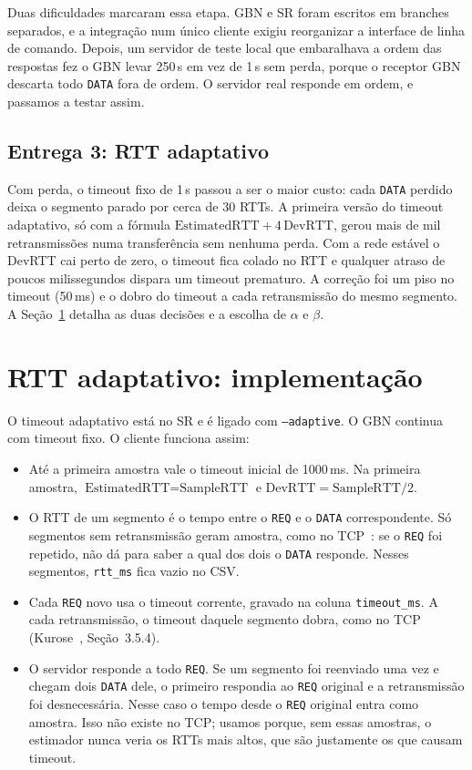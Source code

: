 \documentclass[11pt,a4paper]{article}
\begin{document}
Duas dificuldades marcaram essa etapa. GBN e SR foram escritos em branches
separados, e a integração num único cliente exigiu reorganizar a interface de
linha de comando. Depois, um servidor de teste local que embaralhava a ordem
das respostas fez o GBN levar 250\,s em vez de 1\,s sem perda, porque o
receptor GBN descarta todo \texttt{DATA} fora de ordem. O servidor real responde
em ordem, e passamos a testar assim.

\subsection{Entrega 3: RTT adaptativo}

Com perda, o timeout fixo de 1\,s passou a ser o maior custo: cada
\texttt{DATA} perdido deixa o segmento parado por cerca de 30 RTTs. A primeira
versão do timeout adaptativo, só com a fórmula $\text{EstimatedRTT} +
4\,\text{DevRTT}$, gerou mais de mil retransmissões numa transferência sem
nenhuma perda. Com a
rede estável o DevRTT cai perto de zero, o timeout fica colado no RTT e
qualquer atraso de poucos milissegundos dispara um timeout prematuro. A
correção foi um piso no timeout (50\,ms) e o dobro do timeout a cada
retransmissão do mesmo segmento. A Seção~\ref{sec:rtt} detalha as duas
decisões e a escolha de $\alpha$ e $\beta$.

\section{RTT adaptativo: implementação}
\label{sec:rtt}

O timeout adaptativo está no SR e é ligado com \texttt{--adaptive}. O GBN
continua com timeout fixo. O cliente funciona assim:
\begin{itemize}[nosep]
  \item Até a primeira amostra vale o timeout inicial de 1000\,ms. Na primeira
    amostra, $\text{EstimatedRTT} = \text{SampleRTT}$ e
    $\text{DevRTT} = \text{SampleRTT}/2$.
  \item O RTT de um segmento é o tempo entre o \texttt{REQ} e o \texttt{DATA}
    correspondente. Só segmentos sem retransmissão geram amostra, como no
    TCP~\cite{kurose}: se o \texttt{REQ} foi repetido, não dá para saber a qual
    dos dois o \texttt{DATA} responde. Nesses segmentos, \texttt{rtt\_ms} fica
    vazio no CSV.
  \item Cada \texttt{REQ} novo usa o timeout corrente, gravado na coluna
    \texttt{timeout\_ms}. A cada retransmissão, o timeout daquele segmento
    dobra, como no TCP (Kurose~\cite{kurose}, Seção~3.5.4).
  \item O servidor responde a todo \texttt{REQ}. Se um segmento foi reenviado
    uma vez e chegam dois \texttt{DATA} dele, o primeiro respondia ao
    \texttt{REQ} original e a retransmissão foi desnecessária. Nesse caso o
    tempo desde o \texttt{REQ} original entra como amostra. Isso não existe no
    TCP; usamos porque, sem essas amostras, o estimador nunca veria os RTTs
    mais altos, que são justamente os que causam timeout.
\end{itemize}
\end{document}
